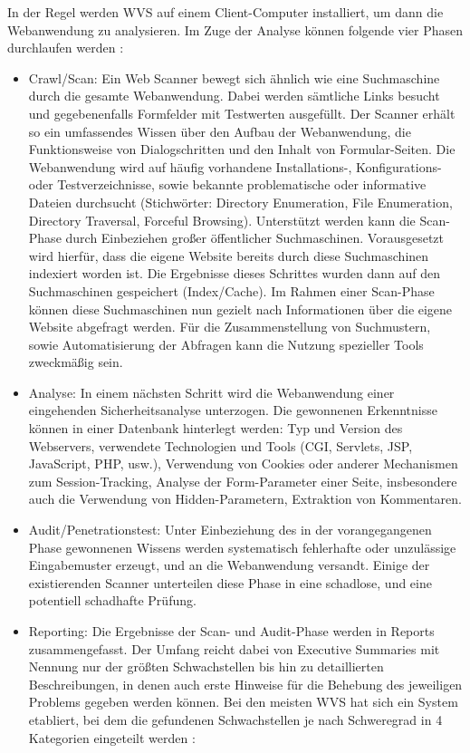 \documentclass[12pt,oneside,a4paper,parskip]{scrbook}
\begin{document}
  In der Regel werden WVS auf einem Client-Computer installiert, um dann die Webanwendung zu analysieren. Im Zuge der Analyse können folgende vier Phasen durchlaufen werden \cite{BSI4}:
  \begin{itemize}
    \item Crawl/Scan:
    Ein Web Scanner bewegt sich ähnlich wie eine Suchmaschine durch die gesamte
    Webanwendung. Dabei werden sämtliche Links besucht und gegebenenfalls Formfelder mit Testwerten ausgefüllt. Der Scanner erhält so ein umfassendes Wissen über den Aufbau der Webanwendung, die Funktionsweise von Dialogschritten und den Inhalt von Formular-Seiten.
    Die Webanwendung wird auf häufig vorhandene Installations-, Konfigurations- oder
    Testverzeichnisse, sowie bekannte problematische oder informative Dateien durchsucht (Stichwörter: Directory Enumeration, File Enumeration, Directory Traversal, Forceful Browsing).
    Unterstützt werden kann die Scan-Phase durch Einbeziehen großer öffentlicher
    Suchmaschinen. Vorausgesetzt wird hierfür, dass die eigene Website bereits durch
    diese Suchmaschinen indexiert worden ist. Die Ergebnisse dieses Schrittes wurden
    dann auf den Suchmaschinen gespeichert (Index/Cache). Im Rahmen einer Scan-Phase können diese Suchmaschinen nun gezielt nach Informationen über die eigene Website abgefragt werden. Für die Zusammenstellung von Suchmustern, sowie Automatisierung der Abfragen kann die Nutzung spezieller Tools zweckmäßig sein.
    \item Analyse:
    In einem nächsten Schritt wird die Webanwendung einer eingehenden Sicherheitsanalyse unterzogen. Die gewonnenen Erkenntnisse können in einer Datenbank hinterlegt werden: Typ und Version des Webservers, verwendete Technologien und Tools (CGI, Servlets, JSP, JavaScript, PHP, usw.), Verwendung von Cookies oder
    anderer Mechanismen zum Session-Tracking, Analyse der Form-Parameter einer Seite, insbesondere auch die Verwendung von Hidden-Parametern, Extraktion von Kommentaren.
    \item Audit/Penetrationstest:
    Unter Einbeziehung des in der vorangegangenen Phase gewonnenen Wissens werden
    systematisch fehlerhafte oder unzulässige Eingabemuster erzeugt, und an die Webanwendung versandt. Einige der existierenden Scanner unterteilen diese Phase in eine schadlose, und eine potentiell schadhafte Prüfung.
    \item Reporting:
    Die Ergebnisse der Scan- und Audit-Phase werden in Reports zusammengefasst. Der
    Umfang reicht dabei von Executive Summaries mit Nennung nur der größten Schwachstellen bis hin zu detaillierten Beschreibungen, in denen auch erste Hinweise für die Behebung des jeweiligen Problems gegeben werden können. Bei den meisten WVS hat sich ein System etabliert, bei dem die gefundenen Schwachstellen je nach Schweregrad in 4 Kategorien eingeteilt werden \cite{Lepofsky}:

\end{itemize}
\end{document}
